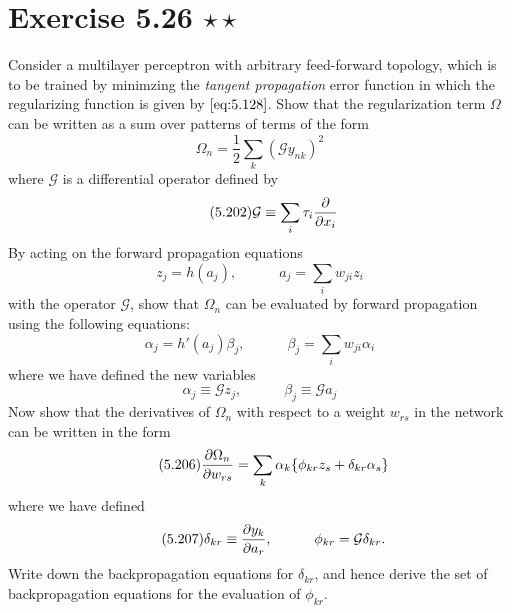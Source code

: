 \section*{Exercise 5.26 $\star \star$}
Consider a multilayer perceptron with arbitrary feed-forward topology, 
which is to be trained by minimzing the \emph{tangent propagation} error
function in which the regularizing function is given by
$\eqref{eq:5.128}$. Show that the regularization term $\Omega$ can
be written as a sum over patterns of terms of the form
\begin{equation}\label{eq:5.201}\tag{5.201}
    \Omega_n = \frac{1}{2} \sum_{k} (\mathcal{G}y_{nk})^2
\end{equation}
where $\mathcal{G}$ is a differential operator defined by
 \begin{equation}\label{eq:5.202}\tag{5.202}
     \mathcal{G} \equiv \sum_{i} \tau_i \pdv{x_i}
\end{equation}
By acting on the forward propagation equations
\begin{equation}\label{eq:5.203}\tag{5.203}
    z_j = h(a_j),
    \hspace{3em}
    a_j = \sum_{i} w_{ji} z_i
\end{equation}
with the operator $\mathcal{G}$, show that $\Omega_n$ 
can be evaluated by forward propagation using the following equations:
\begin{equation}\label{eq:5.204}\tag{5.204}
    \alpha_j = h'(a_j) \beta_j,
    \hspace{3em}
    \beta_j = \sum_{i} w_{ji} \alpha_i
\end{equation}
where we have defined the new variables
\begin{equation}\label{eq:5.205}\tag{5.205}
    \alpha_j \equiv \mathcal{G} z_j,
    \hspace{3em}
    \beta_j \equiv \mathcal{G} a_j
\end{equation}
Now show that the derivatives of $\Omega_n$ with respect to a weight $w_{rs}$ in the network 
can be written in the form  
\begin{equation}\label{eq:5.206}\tag{5.206}
    \pdv{\Omega_n}{w_{rs}} = \sum_{k} \alpha_k \{\phi_{kr} z_s + \delta_{kr} \alpha_s\}
\end{equation}
where we have defined 
\begin{equation}\label{eq:5.207}\tag{5.207}
    \delta_{kr} \equiv \pdv{y_k}{a_r},
    \hspace{3em}
    \phi_{kr} = \mathcal{G} \delta_{kr}.
\end{equation}
Write down the backpropagation equations for $\delta_{kr}$, and hence derive
the set of backpropagation equations for the evaluation of $\phi_{kr}$.

